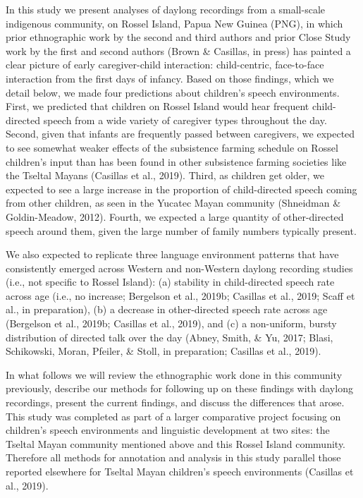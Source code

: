 \documentclass[,man,mask,floatsintext]{apa6}
\begin{document}
In this study we present analyses of daylong recordings from a
small-scale indigenous community, on Rossel Island, Papua New Guinea
(PNG), in which prior ethnographic work by the second and third authors
and prior Close Study work by the first and second authors (Brown \&
Casillas, in press) has painted a clear picture of early caregiver-child
interaction: child-centric, face-to-face interaction from the first days
of infancy. Based on those findings, which we detail below, we made four
predictions about children's speech environments. First, we predicted
that children on Rossel Island would hear frequent child-directed speech
from a wide variety of caregiver types throughout the day. Second, given
that infants are frequently passed between caregivers, we expected to
see somewhat weaker effects of the subsistence farming schedule on
Rossel children's input than has been found in other subsistence farming
societies like the Tseltal Mayans (Casillas et al., 2019). Third, as
children get older, we expected to see a large increase in the
proportion of child-directed speech coming from other children, as seen
in the Yucatec Mayan community (Shneidman \& Goldin-Meadow, 2012).
Fourth, we expected a large quantity of other-directed speech around
them, given the large number of family numbers typically present.

We also expected to replicate three language environment patterns that
have consistently emerged across Western and non-Western daylong
recording studies (i.e., not specific to Rossel Island): (a) stability
in child-directed speech rate across age (i.e., no increase; Bergelson
et al., 2019b; Casillas et al., 2019; Scaff et al., in preparation), (b)
a decrease in other-directed speech rate across age (Bergelson et al.,
2019b; Casillas et al., 2019), and (c) a non-uniform, bursty
distribution of directed talk over the day (Abney, Smith, \& Yu, 2017;
Blasi, Schikowski, Moran, Pfeiler, \& Stoll, in preparation; Casillas et
al., 2019).

In what follows we will review the ethnographic work done in this
community previously, describe our methods for following up on these
findings with daylong recordings, present the current findings, and
discuss the differences that arose. This study was completed as part of
a larger comparative project focusing on children's speech environments
and linguistic development at two sites: the Tseltal Mayan community
mentioned above and this Rossel Island community. Therefore all methods
for annotation and analysis in this study parallel those reported
elsewhere for Tseltal Mayan children's speech environments (Casillas et
al., 2019).
\end{document}
